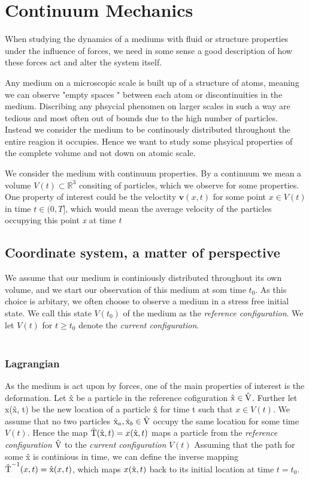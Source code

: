 \chapter{Continuum Mechanics}
When studying the dynamics of a mediums with fluid or structure properties under the influence of forces, we need in some sense a good description of how these forces act and alter the system itself.

Any medium on a microscopic scale is built up of a structure of atoms, meaning we can observe "empty spaces " between each atom or discontinuities in the medium. Discribing any phsycial phenomen on larger scales in such a way are tedious and most often out of bounds due to the high number of particles. Instead we consider the medium to be continously distributed throughout the entire reagion it occupies. Hence we want to study some phsyical properties of the complete volume and not down on atomic scale. 

We consider the medium with continuum properties. By a continuum we mean a volume $V(t) \subset \mathbb{R}^3$ 
consiting of particles, which we observe for some properties. One property of interest could be the veloctity $\textbf{v}(x,t)$ for some point $x \in V(t)$ in time $t \in (0, T]$, which would mean the average velocity of the particles occupying this point \textit{x} at time \textit{t}  

\section{Coordinate system, a matter of perspective}
We assume that our medium is continiously distributed throughout its own volume, and we start our observation of this medium
at som time $t_0$. As this choice is arbitary, we often choose to observe a medium in a stress free initial state. We call this state $V(t_0)$ of the medium as the \textit{reference configuration}. We let $V(t)$ for 
$t \geq t_0$ denote the \textit{current configuration}. \\ \\

\subsection{Lagrangian}
As the medium is act upon by forces, one of the main properties of interest is the deformation. Let \^{x} be a particle in the reference cofiguration $\text{\^{x}} \in \text{\^{V}}$. 
Further let x(\^x, t) be the new location of a particle \^x for time t such that $x \in V(t)$. We assume that no two particles $\text{\^{x}}_a, \text{\^{x}}_b \in \text{\^{V}}$ occupy the same location for some time $V(t)$.
Hence the map $\text{\^{T}}(\text{\^{x}}, t) = x(\text{\^{x}}, t)$ maps a particle  from the \textit{reference configuration} $\text{\^{V}}$ to the  \textit{current configuration} $V(t)$
Assuming that the path for some \^{x} is continious in time, we can define the inverse mapping $\text{\^{T}}^{-1}(x, t) = \text{\^{x}}(x, t)$, which maps $x(\text{\^{x}}, t)$ back to its initial location at time $t = t_0$. \\

